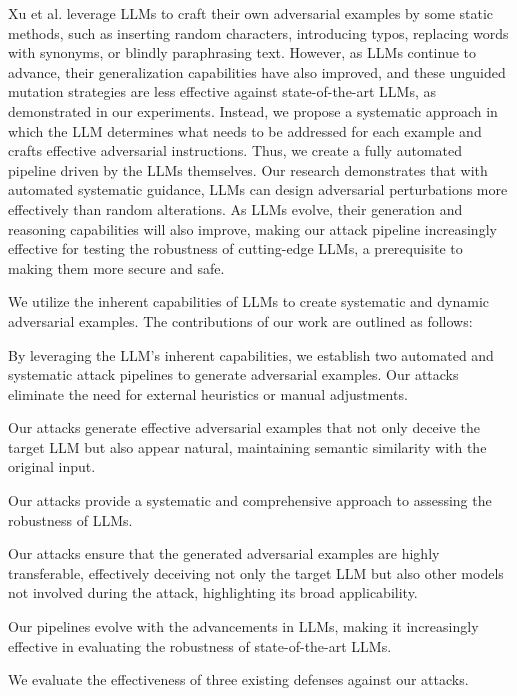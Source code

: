 \documentclass[11pt]{article}
\newcommand{\smallbullet}{\raisebox{0.2ex}{\tiny\ding{108}}}
\begin{document}
Xu et al. \cite{xu2023llmfoolitselfpromptbased} leverage LLMs to craft their own adversarial examples by some static methods, such as inserting random characters, introducing typos, replacing words with synonyms, or blindly paraphrasing text. However, as LLMs continue to advance, their generalization capabilities have also improved, and these unguided mutation strategies are less effective against state-of-the-art LLMs, as demonstrated in our experiments. Instead, we propose a systematic approach in which the LLM determines what needs to be addressed for each example and crafts effective adversarial instructions. Thus, we create a fully automated pipeline driven by the LLMs themselves. Our research demonstrates that with automated systematic guidance, LLMs can design adversarial perturbations more effectively than random alterations. As LLMs evolve, their generation and reasoning capabilities will also improve, making our attack pipeline increasingly effective for testing the robustness of cutting-edge LLMs, a prerequisite to making them more secure and safe.

We utilize the inherent capabilities \cite{huang2023reasoninglargelanguagemodels} of LLMs to create systematic and dynamic adversarial examples. The contributions of our work are outlined as
follows:

    \noindent
    \smallbullet{} By leveraging the LLM's inherent capabilities, we establish two automated and systematic attack pipelines to generate adversarial examples. Our attacks eliminate the need for external heuristics or manual adjustments.
   
    \noindent
    \smallbullet{} Our attacks generate effective adversarial examples that not only deceive the target LLM but also appear natural, maintaining semantic similarity with the original input.

    \noindent
    \smallbullet{} Our attacks provide a systematic and comprehensive approach to assessing the robustness of LLMs.
    
    \noindent
    \smallbullet{} Our attacks ensure that the generated adversarial examples are highly transferable, effectively deceiving not only the target LLM but also other models not involved during the attack, highlighting its broad applicability.
    
    \noindent
    \smallbullet{} Our pipelines evolve with the advancements in LLMs, making it increasingly effective in evaluating the robustness of state-of-the-art LLMs.

    \noindent
    \smallbullet{} We evaluate the effectiveness of three existing defenses against our attacks.
\end{document}

